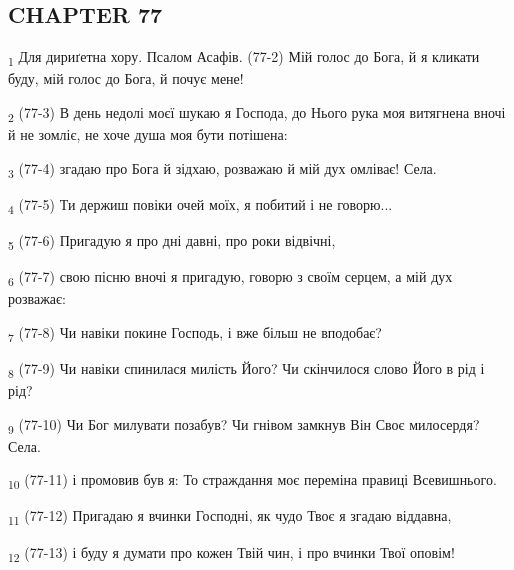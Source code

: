 \subsection{CHAPTER 77}
\begin{tcolorbox}
\textsubscript{1} Для дириґетна хору. Псалом Асафів. (77-2) Мій голос до Бога, й я кликати буду, мій голос до Бога, й почує мене!
\end{tcolorbox}
\begin{tcolorbox}
\textsubscript{2} (77-3) В день недолі моєї шукаю я Господа, до Нього рука моя витягнена вночі й не зомліє, не хоче душа моя бути потішена:
\end{tcolorbox}
\begin{tcolorbox}
\textsubscript{3} (77-4) згадаю про Бога й зідхаю, розважаю й мій дух омліває! Села.
\end{tcolorbox}
\begin{tcolorbox}
\textsubscript{4} (77-5) Ти держиш повіки очей моїх, я побитий і не говорю...
\end{tcolorbox}
\begin{tcolorbox}
\textsubscript{5} (77-6) Пригадую я про дні давні, про роки відвічні,
\end{tcolorbox}
\begin{tcolorbox}
\textsubscript{6} (77-7) свою пісню вночі я пригадую, говорю з своїм серцем, а мій дух розважає:
\end{tcolorbox}
\begin{tcolorbox}
\textsubscript{7} (77-8) Чи навіки покине Господь, і вже більш не вподобає?
\end{tcolorbox}
\begin{tcolorbox}
\textsubscript{8} (77-9) Чи навіки спинилася милість Його? Чи скінчилося слово Його в рід і рід?
\end{tcolorbox}
\begin{tcolorbox}
\textsubscript{9} (77-10) Чи Бог милувати позабув? Чи гнівом замкнув Він Своє милосердя? Села.
\end{tcolorbox}
\begin{tcolorbox}
\textsubscript{10} (77-11) і промовив був я: То страждання моє переміна правиці Всевишнього.
\end{tcolorbox}
\begin{tcolorbox}
\textsubscript{11} (77-12) Пригадаю я вчинки Господні, як чудо Твоє я згадаю віддавна,
\end{tcolorbox}
\begin{tcolorbox}
\textsubscript{12} (77-13) і буду я думати про кожен Твій чин, і про вчинки Твої оповім!
\end{tcolorbox}
